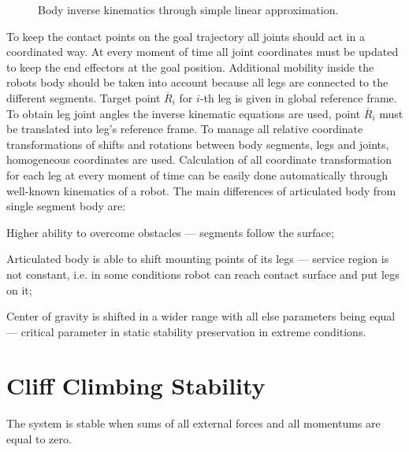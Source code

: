 \documentclass{ws-procs9x6}
\begin{document}
\begin{figure}
  \begin{center}
  \end{center}
  \caption{Body inverse kinematics through simple linear approximation.}
  \label{aba:spline}
\end{figure}

To keep the contact points on the goal trajectory all joints should act in a coordinated way. At every moment of time all joint coordinates must be updated to keep the end effectors at the goal position. Additional mobility inside the robots body should be taken into account because all legs are connected to the different segments.  Target point $\overline{R}_i$ for $i$-th leg is given in global reference frame. To obtain leg joint angles the inverse kinematic equations are used, point $\overline{R}_i$ must be translated into leg’s reference frame. To manage all relative coordinate transformations of shifts and rotations between body segments, legs and joints, homogeneous coordinates are used. Calculation of all coordinate transformation for each leg at every moment of time can be easily done automatically through well-known kinematics of a robot.
The main differences of articulated body from single segment body are:
\begin{itemlist}
  \item Higher ability to overcome obstacles –-- segments follow the surface;
  \item Articulated body is able to shift mounting points of its legs –-- service region is not constant, i.e. in some conditions robot can reach contact surface and put legs on it;
  \item Center of gravity is shifted in a wider range with all else parameters being equal –-- critical parameter in static stability preservation in extreme conditions.
\end{itemlist}


\section{Cliff Climbing Stability}
The system is stable when sums of all external forces and all momentums are equal to zero. 
\end{document}
